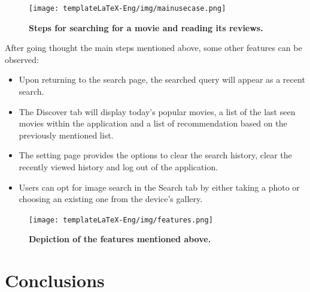 \documentclass[12pt,a4paper,twoside]{report}
\begin{document}
 \begin{figure}[H]
    \begin{center}
        \texttt{[image: templateLaTeX-Eng/img/mainusecase.png]}
        \caption{\bf Steps for searching for a movie and reading its reviews.}
    \end{center}
\end{figure}

After going thought the main steps mentioned above, some other features can be observed:
\begin{itemize}
    \item Upon returning to the search page, the searched query will appear as a recent search.
    \item The Discover tab will display today's popular movies, a list of the last seen movies within the application and a list of recommendation based on the previously mentioned list.
    \item The setting page provides the options to clear the search history, clear the recently viewed history and log out of the application.
    \item Users can opt for image search in the Search tab by either taking a photo or choosing an existing one from the device's gallery.
\end{itemize}

\begin{figure}[H]
    \begin{center}
        \texttt{[image: templateLaTeX-Eng/img/features.png]}
        \caption{\bf Depiction of the features mentioned above.}
    \end{center}
\end{figure}

\chapter{Conclusions}
\end{document}
